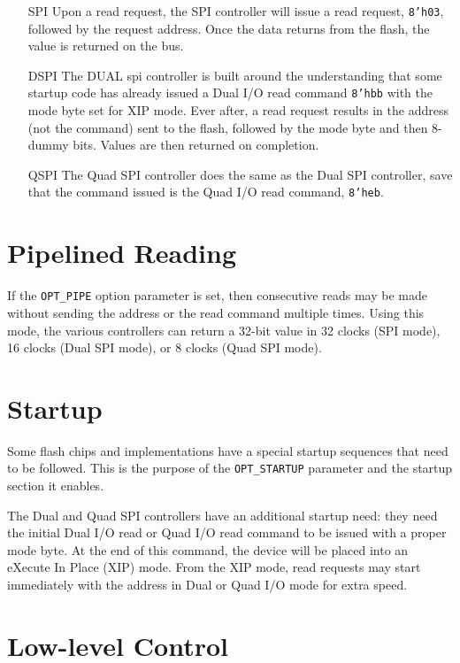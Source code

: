 \documentclass{gqtekspec}
\begin{document}
\begin{itemize}
\item[SPI] Upon a read request, the SPI controller will issue a read request,
	{\tt 8'h03}, followed by the request address.  Once the data returns
	from the flash, the value is returned on the bus.

\item[DSPI] The DUAL spi controller is built around the understanding that
	some startup code has already issued a Dual I/O read command
	{\tt 8'hbb} with the mode byte set for XIP mode.  Ever after, a read
	request results in the address (not the command) sent to the flash,
	followed by the mode byte and then 8-dummy bits.  Values are then
	returned on completion.

\item[QSPI] The Quad SPI controller does the same as the Dual SPI controller,
	save that the command issued is the Quad I/O read command, {\tt 8'heb}.
\end{itemize}

\section{Pipelined Reading}
If the {\tt OPT\_PIPE} option parameter is set, then consecutive reads may be
made without sending the address or the read command multiple times.  Using
this mode, the various controllers can return a 32-bit value in 32 clocks (SPI
mode), 16 clocks (Dual SPI mode), or 8 clocks (Quad SPI mode).

\section{Startup}

Some flash chips and implementations have a special startup sequences that
need to be followed.  This is the purpose of the {\tt OPT\_STARTUP} parameter
and the startup section it enables.

The Dual and Quad SPI controllers have an additional startup need: they need
the initial Dual I/O read or Quad I/O read command to be issued with a
proper mode byte.  At the end of this command, the device will be placed into
an eXecute In Place (XIP) mode.  From the XIP mode, read requests may start
immediately with the address in Dual or Quad I/O mode for extra speed.

\section{Low-level Control}
\end{document}
